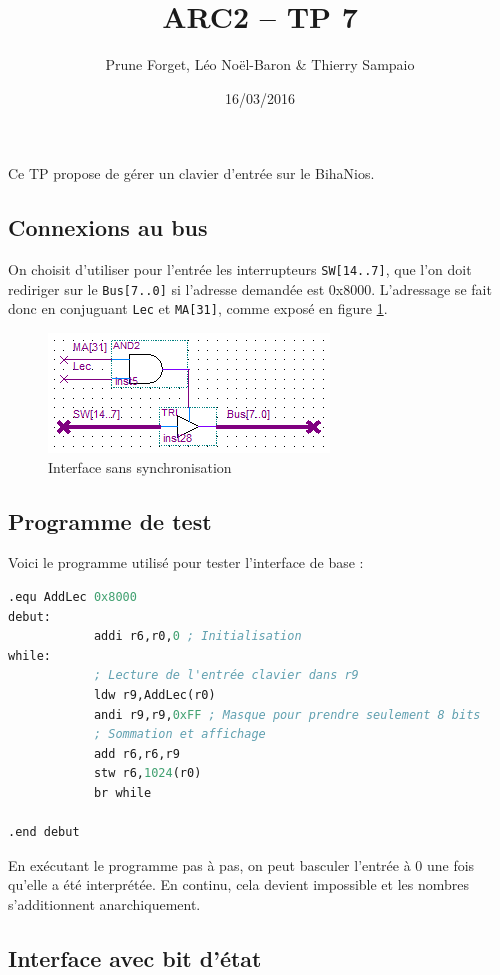 \documentclass[a4paper,11pt]{article}
\title{ARC2 -- TP 7}
\author{Prune Forget, Léo Noël-Baron \& Thierry Sampaio}
\date{16/03/2016}
\begin{document}
\maketitle

Ce TP propose de gérer un clavier d'entrée sur le BihaNios.

\subsection*{Connexions au bus}

On choisit d'utiliser pour l'entrée les interrupteurs \verb?SW[14..7]?, que l'on doit rediriger sur le \verb?Bus[7..0]? si l'adresse demandée est 0x8000. L'adressage se fait donc en conjuguant \verb?Lec? et \verb?MA[31]?, comme exposé en figure \ref{async}.

\begin{figure}[h]\center
\includegraphics[scale=0.7]{tp7-1.PNG}
\caption{Interface sans synchronisation}
\label{async}
\end{figure}

\subsection*{Programme de test}

Voici le programme utilisé pour tester l'interface de base :
\begin{lstlisting}[language=Lisp]
.equ AddLec 0x8000
debut:
            addi r6,r0,0 ; Initialisation
while:
			; Lecture de l'entrée clavier dans r9
            ldw r9,AddLec(r0)
            andi r9,r9,0xFF ; Masque pour prendre seulement 8 bits
            ; Sommation et affichage
            add r6,r6,r9
            stw r6,1024(r0)
            br while
            
.end debut
\end{lstlisting}

En exécutant le programme pas à pas, on peut basculer l'entrée à 0 une fois qu'elle a été interprétée. En continu, cela devient impossible et les nombres s'additionnent anarchiquement.

\subsection*{Interface avec bit d'état}
\end{document}
